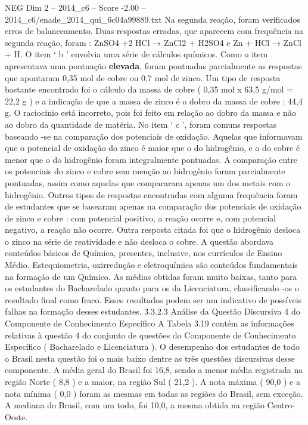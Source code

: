 \begin{textsample}{NEG Dim 2 – 2014\_c6 – Score -2.00 – 2014\_c6/enade\_2014\_qui\_6c04a99889.txt}
Na segunda reação, foram verificados erros de balanceamento.
Duas respostas erradas, que aparecem com frequência na segunda reação, foram : ZnSO4 +2 HCl → ZnCl2 + H2SO4 e Zn + HCl → ZnCl + H.
O item ‘ b ’ envolvia uma série de cálculos químicos.
Como o item apresentava uma pontuação \textbf{elevada}, foram pontuadas parcialmente as respostas que apontaram 0,35 mol de cobre ou 0,7 mol de zinco.
Um tipo de resposta bastante encontrado foi o cálculo da massa de cobre ( 0,35 mol x 63,5 g/mol = 22,2 g ) e a indicação de que a massa de zinco é o dobro da massa de cobre : 44,4 g.
O raciocínio está incorreto, pois foi feito em relação ao dobro da massa e não ao dobro da quantidade de matéria.
No item ‘ c ’, foram comuns respostas baseando -se na comparação dos potenciais de oxidação.
Aquelas que informavam que o potencial de oxidação do zinco é maior que o do hidrogênio, e o do cobre é menor que o do hidrogênio foram integralmente pontuadas.
A comparação entre os potenciais do zinco e cobre sem menção ao hidrogênio foram parcialmente pontuadas, assim como aquelas que compararam apenas um dos metais com o hidrogênio.
Outros tipos de respostas encontradas com alguma frequência foram de estudantes que se basearam apenas na comparação dos potenciais de oxidação de zinco e cobre : com potencial positivo, a reação ocorre e, com potencial negativo, a reação não ocorre.
Outra resposta citada foi que o hidrogênio desloca o zinco na série de reatividade e não desloca o cobre.
A questão abordava conteúdos básicos de Química, presentes, inclusive, nos currículos de Ensino Médio.
Estequiometria, oxirredução e eletroquímica são conteúdos fundamentais na formação de um Químico.
As médias obtidas foram muito baixas, tanto para os estudantes do Bacharelado quanto para os da Licenciatura, classificando -os o resultado final como fraco.
Esses resultados podem ser um indicativo de possíveis falhas na formação desses estudantes. 3.3.2.3 Análise da Questão Discursiva 4 do Componente de Conhecimento Específico A Tabela 3.19 contém as informações relativas à questão 4 do conjunto de questões do Componente de Conhecimento Específico ( Bacharelado e Licenciatura ).
O desempenho dos estudantes de todo o Brasil nesta questão foi o mais baixo dentre as três questões discursivas desse componente.
A média geral do Brasil foi 16,8, sendo a menor média registrada na região Norte ( 8,8 ) e a maior, na região Sul ( 21,2 ).
A nota máxima ( 90,0 ) e a nota mínima ( 0,0 ) foram as mesmas em todas as regiões do Brasil, sem exceção.
A mediana do Brasil, com um todo, foi 10,0, a mesma obtida na região Centro-Oeste.

\end{textsample}
